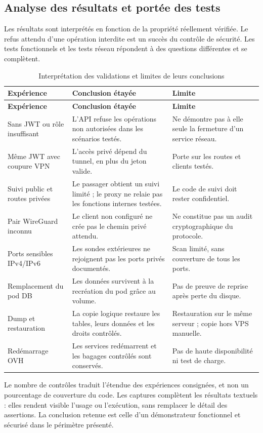 \documentclass[11pt]{extarticle}
\begin{document}
\subsection{Analyse des résultats et portée des tests}
Les résultats sont interprétés en fonction de la propriété réellement vérifiée. Le refus attendu d'une opération interdite est un succès du contrôle de sécurité. Les tests fonctionnels et les tests réseau répondent à des questions différentes et se complètent.
{
\begin{longtable}{p{3.1cm}p{5.7cm}p{4.6cm}}
\caption{Interprétation des validations et limites de leurs conclusions}\\\toprule
\textbf{Expérience} & \textbf{Conclusion étayée} & \textbf{Limite}\\\midrule\endfirsthead
\toprule\textbf{Expérience} & \textbf{Conclusion étayée} & \textbf{Limite}\\\midrule\endhead
Sans JWT ou rôle insuffisant & L'API refuse les opérations non autorisées dans les scénarios testés. & Ne démontre pas à elle seule la fermeture d'un service réseau.\\
Même JWT avec coupure VPN & L'accès privé dépend du tunnel, en plus du jeton valide. & Porte sur les routes et clients testés.\\
Suivi public et routes privées & Le passager obtient un suivi limité ; le proxy ne relaie pas les fonctions internes testées. & Le code de suivi doit rester confidentiel.\\
Pair WireGuard inconnu & Le client non configuré ne crée pas le chemin privé attendu. & Ne constitue pas un audit cryptographique du protocole.\\
Ports sensibles IPv4/IPv6 & Les sondes extérieures ne rejoignent pas les ports privés documentés. & Scan limité, sans couverture de tous les ports.\\
Remplacement du pod DB & Les données survivent à la recréation du pod grâce au volume. & Pas de preuve de reprise après perte du disque.\\
Dump et restauration & La copie logique restaure les tables, leurs données et les droits contrôlés. & Restauration sur le même serveur ; copie hors VPS manuelle.\\
Redémarrage OVH & Les services redémarrent et les bagages contrôlés sont conservés. & Pas de haute disponibilité ni test de charge.\\\bottomrule
\end{longtable}
}
Le nombre de contrôles traduit l'étendue des expériences consignées, et non un pourcentage de couverture du code. Les captures complètent les résultats textuels : elles rendent visible l'usage ou l'exécution, sans remplacer le détail des assertions. La conclusion retenue est celle d'un démonstrateur fonctionnel et sécurisé dans le périmètre présenté.
\FloatBarrier
\end{document}
